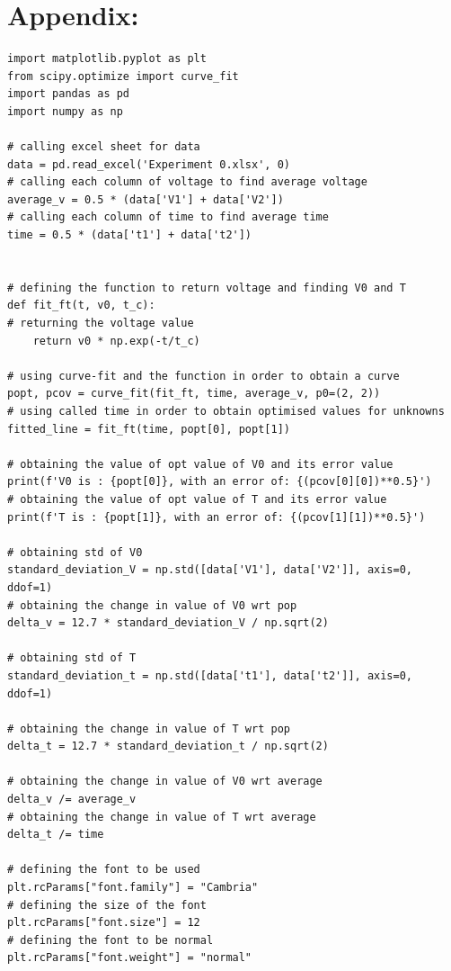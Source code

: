 \documentclass[12pt, a4paper]{article}
\begin{document}
\section*{Appendix:}
\begin{verbatim}
import matplotlib.pyplot as plt
from scipy.optimize import curve_fit
import pandas as pd
import numpy as np

# calling excel sheet for data
data = pd.read_excel('Experiment 0.xlsx', 0)    
# calling each column of voltage to find average voltage
average_v = 0.5 * (data['V1'] + data['V2'])     
# calling each column of time to find average time
time = 0.5 * (data['t1'] + data['t2'])          


# defining the function to return voltage and finding V0 and T 
def fit_ft(t, v0, t_c):                         
# returning the voltage value    
    return v0 * np.exp(-t/t_c)                  
 
# using curve-fit and the function in order to obtain a curve
popt, pcov = curve_fit(fit_ft, time, average_v, p0=(2, 2))  
# using called time in order to obtain optimised values for unknowns
fitted_line = fit_ft(time, popt[0], popt[1])                
 
# obtaining the value of opt value of V0 and its error value
print(f'V0 is : {popt[0]}, with an error of: {(pcov[0][0])**0.5}')     
# obtaining the value of opt value of T and its error value
print(f'T is : {popt[1]}, with an error of: {(pcov[1][1])**0.5}')      

# obtaining std of V0 
standard_deviation_V = np.std([data['V1'], data['V2']], axis=0, ddof=1)  
# obtaining the change in value of V0 wrt pop
delta_v = 12.7 * standard_deviation_V / np.sqrt(2)                       
 
# obtaining std of T
standard_deviation_t = np.std([data['t1'], data['t2']], axis=0, ddof=1)  

# obtaining the change in value of T wrt pop
delta_t = 12.7 * standard_deviation_t / np.sqrt(2)                       
 
# obtaining the change in value of V0 wrt average
delta_v /= average_v                                                     
# obtaining the change in value of T wrt average
delta_t /= time                                                          
 
# defining the font to be used
plt.rcParams["font.family"] = "Cambria"                                  
# defining the size of the font
plt.rcParams["font.size"] = 12                                           
# defining the font to be normal
plt.rcParams["font.weight"] = "normal"                                   
 

\end{verbatim}
\end{document}
